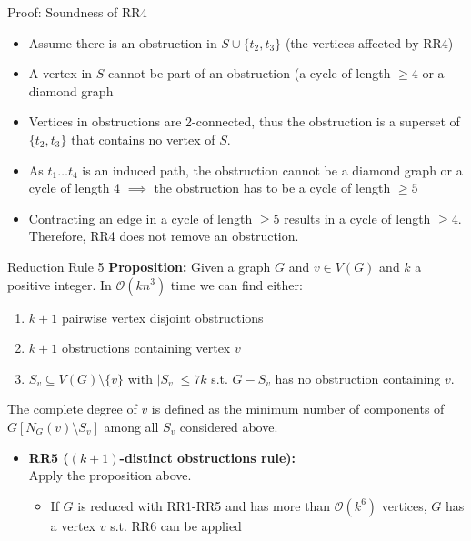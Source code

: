 \documentclass{beamer}
\begin{document}
\begin{frame}{Proof: Soundness of RR4}
    \begin{itemize}[<+->]
        \item Assume there is an obstruction in \(S \cup \{t_2,t_3\}\) (the vertices affected by RR4)
        \item A vertex in \(S\) cannot be part of an obstruction (a cycle of length \(\geq 4\) or a diamond graph 
        \item Vertices in obstructions are 2-connected, thus the obstruction is a superset of \(\{t_2,t_3\}\) that contains no vertex of \(S\).
        \item As \(t_1\ldots t_4\) is an induced path, the obstruction cannot be a diamond graph or a cycle of length 4 $\implies$ the obstruction has to be a cycle of length \(\geq 5\)
        \item Contracting an edge in a cycle of length \(\geq 5\) results in a cycle of length \(\geq 4\). Therefore, RR4 does not remove an obstruction.
    \end{itemize}
\end{frame}
\begin{frame}{Reduction Rule 5}
\textbf{Proposition:} Given a graph $G$ and $v\in V(G)$ and $k$ a positive integer. In $\mathcal O(kn^3)$ time we can find either:
\vspace{-5pt}
\begin{enumerate}
\item $k+1$ pairwise vertex disjoint obstructions
\item $k+1$ obstructions containing vertex $v$
\item $S_v\subseteq V(G)\setminus\{v\}$ with $|S_v| \leq 7k$ s.t. $G- S_v$ has no obstruction containing $v$.
\end{enumerate}
The complete degree of $v$ is defined as the minimum number of components of $G[N_G(v)\setminus S_v]$ among all $S_v$ considered above.
\begin{itemize}
    \item<2-> \textbf{RR5 ($(k+1)$-distinct obstructions rule):}\\
    Apply the proposition above. 
    \begin{itemize}
        \item<3-> If $G$ is reduced with RR1-RR5 and has more than $\mathcal O(k^6)$ vertices, $G$ has a vertex $v$ s.t. RR6 can be applied
    \end{itemize}
\end{itemize}
\end{frame}
\end{document}
